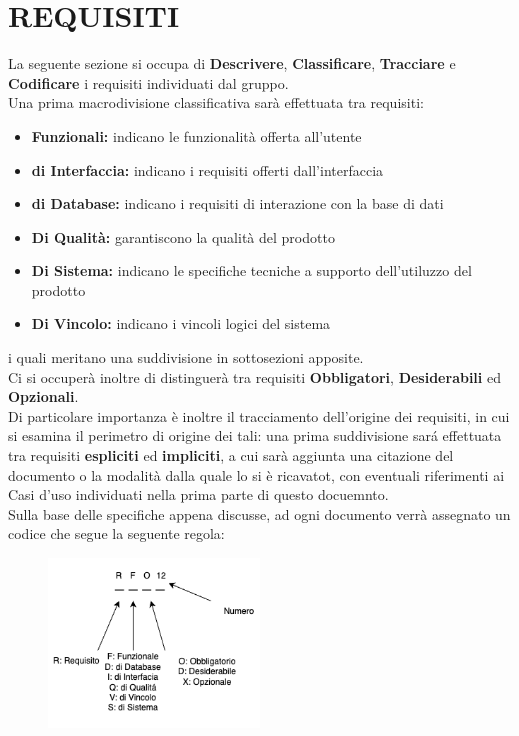 \section{REQUISITI}\label{sec:requisiti}
La seguente sezione si occupa di \textbf{Descrivere}, \textbf{Classificare}, \textbf{Tracciare} e \textbf{Codificare}
i requisiti individuati dal gruppo. \\
Una prima macrodivisione classificativa sarà effettuata tra requisiti:
\begin{itemize}
    \item \textbf{Funzionali: }indicano le funzionalità offerta all'utente
    \item \textbf{di Interfaccia: }indicano i requisiti offerti dall'interfaccia
    \item \textbf{di Database: }indicano i requisiti di interazione con la base di dati
    \item \textbf{Di Qualità: } garantiscono la qualità del prodotto
    \item \textbf{Di Sistema: }indicano le specifiche tecniche a supporto dell'utiluzzo del prodotto
    \item \textbf{Di Vincolo: } indicano i vincoli logici del sistema
\end{itemize}
i quali meritano una suddivisione in sottosezioni apposite.\\
Ci si occuperà inoltre di distinguerà tra requisiti \textbf{Obbligatori}, \textbf{Desiderabili} ed \textbf{Opzionali}.\\ 
Di particolare importanza è inoltre il tracciamento dell'origine dei requisiti, in cui si esamina il perimetro di origine dei tali: una prima suddivisione sará effettuata tra requisiti \textbf{espliciti} ed \textbf{impliciti}, a cui sarà aggiunta una citazione del documento o la modalità dalla quale lo si è ricavatot, con eventuali riferimenti ai Casi d'uso individuati nella prima parte di questo docuemnto.\\
Sulla base delle specifiche appena discusse, ad ogni documento verrà assegnato un codice che segue la seguente regola:

\begin{figure}[h]
 \centering
  \includegraphics[width=0.5\textwidth]{UseCasesImages/requirementsCod.png}
\end{figure}

